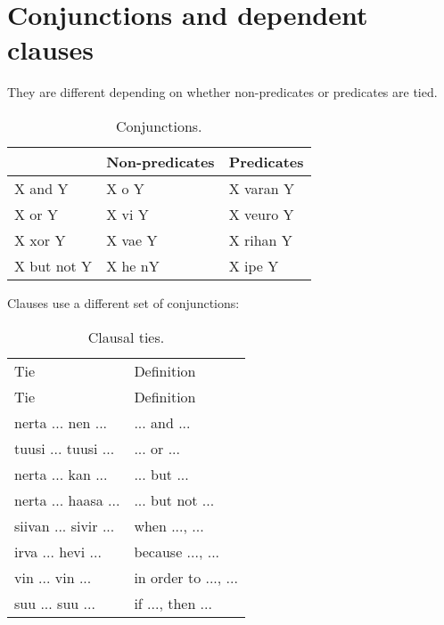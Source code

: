 \documentclass{book}
\begin{document}
\chapter{Conjunctions and dependent clauses}

They are different depending on whether non-predicates or predicates are tied.

\begin{table}[h]
    \caption{Conjunctions.}
    \centering
    \begin{tabular}{|l|l|l|}
        \hline
        & Non-predicates & Predicates \\
        \hline
        X and Y & X o Y & X varan Y \\
        X or Y & X vi Y & X veuro Y \\
        X xor Y & X vae Y & X rihan Y \\
        X but not Y & X he nY & X ipe Y \\
        \hline
    \end{tabular}
\end{table}

Clauses use a different set of conjunctions:

\begin{longtabu}[c]{|X|X|}
    \caption{Clausal ties.}
    \centering
    
    \\ \hline
    Tie & Definition \\
    \hline
    \endfirsthead
    
    \hline
    Tie & Definition \\
    \hline
    \endhead
    
    \hline
    \endfoot
    
    \hline
    \endlastfoot
    
    nerta ... nen ... & ... and ... \\
    tuusi ... tuusi ... & ... or ... \\
    nerta ... kan ... & ... but ... \\
    nerta ... haasa ... & ... but not ... \\
    siivan ... sivir ... & when ..., ... \\
    irva ... hevi ... & because ..., ... \\
    vin ... vin ... & in order to ..., ... \\
    suu ... suu ... & if ..., then ... \\
\end{longtabu}
\end{document}
